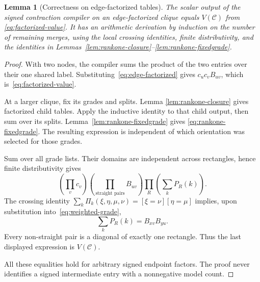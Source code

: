 \documentclass[11pt]{article}
\newtheorem{lemma}[theorem]{Lemma}
\theoremstyle{definition}
\theoremstyle{remark}
\begin{document}
\begin{lemma}[Correctness on edge-factorized tables]
\label{lem:rankone-correctness}
The scalar output of the signed contraction compiler on an
edge-factorized clique equals $V(\mathcal C)$ from
\eqref{eq:factorized-value}. It has an arithmetic derivation by
induction on the number of remaining merges, using the local
crossing identities, finite distributivity, and the identities in
Lemmas~\ref{lem:rankone-closure}--\ref{lem:rankone-fixedgrade}.
\end{lemma}
\begin{proof}
With two nodes, the compiler sums the product of the two entries over
their one shared label. Substituting~\eqref{eq:edge-factorized} gives
$c_uc_vB_{uv}$, which is~\eqref{eq:factorized-value}.

At a larger clique, fix its grades and splits. Lemma
\ref{lem:rankone-closure} gives factorized child tables. Apply the
inductive identity to that child output, then sum over its splits.
Lemma~\ref{lem:rankone-fixedgrade} gives
\eqref{eq:rankone-fixedgrade}. The resulting expression is independent
of which orientation was selected for those grades.

Sum over all grade lists. Their domains are independent across
rectangles, hence finite distributivity gives
\[
 \left(\prod_vc_v\right)
 \left(\prod_{\text{straight pairs}}B_{uv}\right)
 \prod_R\left(\sum_kP_R(k)\right).
\]
The crossing identity
$\sum_k\Pi_k(\xi,\eta,\mu,\nu)=[\xi=\nu][\eta=\mu]$
implies, upon substitution into~\eqref{eq:weighted-grade},
\[
 \sum_kP_R(k)=B_{xv}B_{yu}.
\]
Every non-straight pair is a diagonal of exactly one rectangle.
Thus the last displayed expression is $V(\mathcal C)$.

All these equalities hold for arbitrary signed endpoint factors.
The proof never identifies a signed intermediate entry with a
nonnegative model count.
\end{proof}
\end{document}
